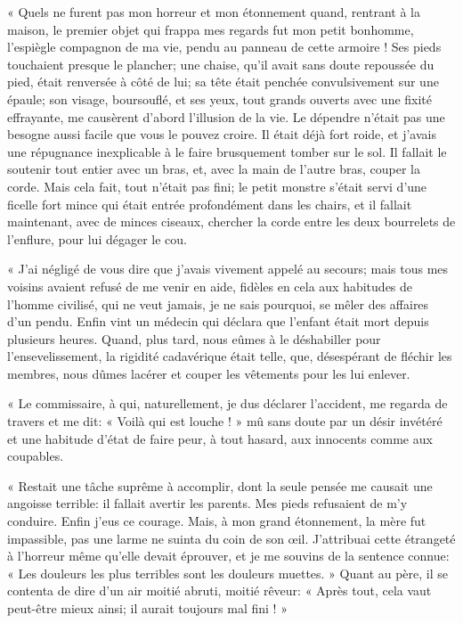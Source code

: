 « Quels ne furent pas mon horreur et mon étonnement quand, rentrant à la
maison, le premier objet qui frappa mes regards fut mon petit bonhomme,
l’espiègle compagnon de ma vie, pendu au panneau de
cette armoire ! Ses pieds touchaient presque le plancher; une chaise,
qu’il avait sans doute repoussée du pied, était
renversée à côté de lui; sa tête était penchée convulsivement sur une
épaule; son visage, boursouflé, et ses yeux, tout grands ouverts avec
une fixité effrayante, me causèrent d’abord
l’illusion de la vie. Le dépendre
n’était pas une besogne aussi facile que vous le
pouvez croire. Il était déjà fort roide, et j’avais
une répugnance inexplicable à le faire brusquement tomber sur le sol.
Il fallait le soutenir tout entier avec un bras, et, avec la main de
l’autre bras, couper la corde. Mais cela fait, tout
n’était pas fini; le petit monstre
s’était servi d’une ficelle fort
mince qui était entrée profondément dans les chairs, et il fallait
maintenant, avec de minces ciseaux, chercher la corde entre les deux
bourrelets de l’enflure, pour lui dégager le cou.

« J’ai négligé de vous dire que
j’avais vivement appelé au secours; mais tous mes
voisins avaient refusé de me venir en aide, fidèles en cela aux
habitudes de l’homme civilisé, qui ne veut jamais, je
ne sais pourquoi, se mêler des affaires d’un pendu.
Enfin vint un médecin qui déclara que l’enfant était
mort depuis plusieurs heures. Quand, plus tard, nous eûmes à le
déshabiller pour l’ensevelissement, la rigidité
cadavérique était telle, que, désespérant de fléchir les membres, nous
dûmes lacérer et couper les vêtements pour les lui enlever.

« Le commissaire, à qui, naturellement, je dus déclarer
l’accident, me regarda de travers et me dit: « Voilà
qui est louche ! » mû sans doute par un désir invétéré et une habitude
d’état de faire peur, à tout hasard, aux innocents
comme aux coupables.

« Restait une tâche suprême à accomplir, dont la seule pensée me causait
une angoisse terrible: il fallait avertir les parents. Mes pieds
refusaient de m’y conduire. Enfin
j’eus ce courage. Mais, à mon grand étonnement, la
mère fut impassible, pas une larme ne suinta du coin de son \oe il.
J’attribuai cette étrangeté à
l’horreur même qu’elle devait
éprouver, et je me souvins de la sentence connue: « Les douleurs les
plus terribles sont les douleurs muettes. » Quant au père, il se
contenta de dire d’un air moitié abruti, moitié
rêveur: « Après tout, cela vaut peut{}-être mieux ainsi; il aurait
toujours mal fini ! »

